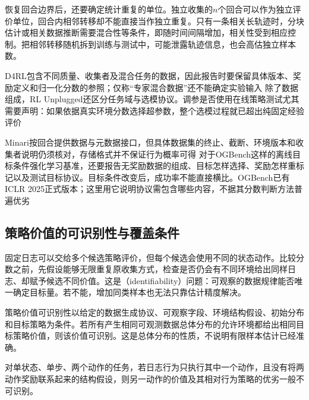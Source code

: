 恢复回合边界后，还要确定统计重复的单位。独立收集的$n$个回合可以作为独立评价单位，回合内相邻转移却不能直接当作独立重复。只有一条相关长轨迹时，分块估计或相关数据推断需要混合性等条件，即随时间间隔增加，相关性受到相应控制。把相邻转移随机拆到训练与测试中，可能泄露轨迹信息，也会高估独立样本数。

D4RL包含不同质量、收集者及混合任务的数据，因此报告时要保留具体版本、奖励定义和归一化分数的参照；仅称“专家混合数据”还不能确定实验输入
除了数据组成，RL Unplugged还区分任务域与选模协议。调参是否使用在线策略测试尤其需要声明：如果依据真实环境分数选择超参数，整个选模过程就已超出纯固定经验评价

Minari按回合提供数据与元数据接口，但具体数据集的终止、截断、环境版本和收集者说明仍须核对，存储格式并不保证行为概率可得
对于OGBench这样的离线目标条件强化学习基准，还要报告无奖励数据的组成、目标怎样选择、奖励怎样重标记以及测试目标协议。目标条件改变后，成功率不能直接横比。OGBench已有ICLR 2025正式版本；这里用它说明协议需包含哪些内容，不据其分数判断方法普遍优劣

\subsection{策略价值的可识别性与覆盖条件}
\label{sec:rl-information-coverage}

固定日志可以交给多个候选策略评价，但每个候选会使用不同的状态动作。比较分数之前，先假设能够无限重复原收集方式，检查是否仍会有不同环境给出同样日志、却赋予候选不同价值。这是（identifiability）问题：可观察的数据规律能否唯一确定目标量。若不能，增加同类样本也无法只靠估计精度解决。

\begin{definition}[策略价值可识别]
  \label{def:rl-information-identifiability}
  策略价值可识别性以给定的数据生成协议、可观察字段、环境结构假设、初始分布和目标策略为条件。若所有产生相同可观测数据总体分布的允许环境都给出相同目标策略价值，则该价值可识别。这是总体分布的性质，不说明有限样本估计已经准确。
\end{definition}

\begin{theorem}[固定经验不能识别未覆盖动作的价值]
  \label{thm:rl-information-unseen-action}
  对单状态、单步、两个动作的任务，若日志行为只执行其中一个动作，且没有将两动作奖励联系起来的结构假设，则另一动作的价值及其相对行为策略的优劣一般不可识别。
\end{theorem}

